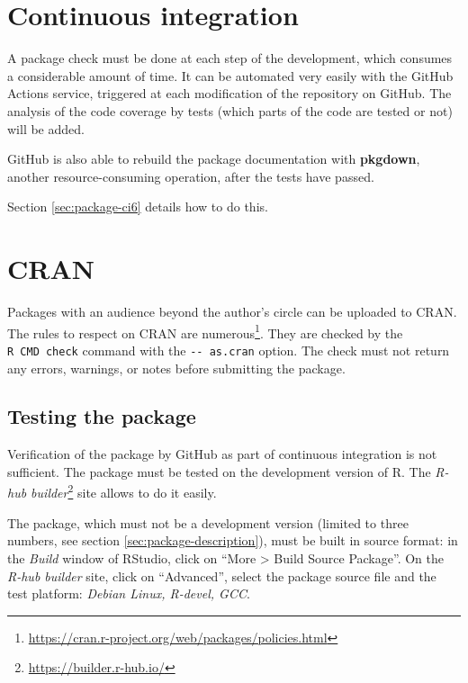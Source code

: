 \documentclass[
  12pt,
  american,
  a4paper,
  extrafontsizes,onecolumn,openright
  ]{memoir}
\begin{document}
\hypertarget{sec:package-ci5}{%
\section{Continuous integration}\label{sec:package-ci5}}

A package check must be done at each step of the development, which consumes a considerable amount of time.
It can be automated very easily with the GitHub Actions service, triggered at each modification of the repository on GitHub.
The analysis of the code coverage by tests (which parts of the code are tested or not) will be added.

GitHub is also able to rebuild the package documentation with \textbf{pkgdown}, another resource-consuming operation, after the tests have passed.

Section \ref{sec:package-ci6} details how to do this.

\hypertarget{sec:package-cran}{%
\section{CRAN}\label{sec:package-cran}}

Packages with an audience beyond the author's circle can be uploaded to CRAN.
The rules to respect on CRAN are numerous\footnote{\url{https://cran.r-project.org/web/packages/policies.html}}. They are checked by the \texttt{R\ CMD\ check} command with the \texttt{-\/-\ as.cran} option.
The check must not return any errors, warnings, or notes before submitting the package.

\hypertarget{testing-the-package}{%
\subsection{Testing the package}\label{testing-the-package}}

Verification of the package by GitHub as part of continuous integration is not sufficient.
The package must be tested on the development version of R.
The \emph{R-hub builder}\footnote{\url{https://builder.r-hub.io/}} site allows to do it easily.

The package, which must not be a development version (limited to three numbers, see section \ref{sec:package-description}), must be built in source format: in the \emph{Build} window of RStudio, click on \enquote{More \textgreater{} Build Source Package}.
On the \emph{R-hub builder} site, click on \enquote{Advanced}, select the package source file and the test platform: \emph{Debian Linux, R-devel, GCC}.
\end{document}
